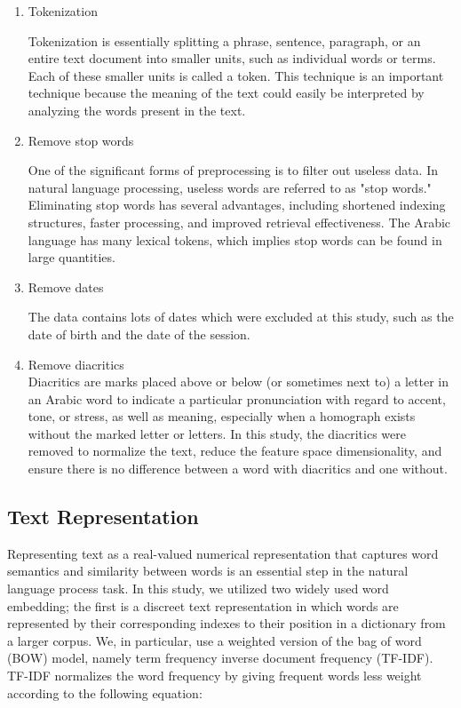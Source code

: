 \documentclass[sn-mathphys,Numbered]{sn-jnl}%
\theoremstyle{thmstyleone}%
\theoremstyle{thmstyletwo}%
\theoremstyle{thmstylethree}%
\begin{document}
\begin{enumerate}


\item Tokenization

Tokenization is essentially splitting a phrase, sentence, paragraph, or an entire text document into smaller units, such as individual words or terms. Each of these smaller units is called a token. This technique is an important technique because the meaning of the text could easily be interpreted by analyzing the words present in the text.

\item Remove stop words

One of the significant forms of preprocessing is to filter out useless data. In natural language processing, useless words are referred to as "stop words." Eliminating stop words has several advantages, including  shortened indexing structures, faster processing, and improved retrieval effectiveness. The Arabic language has many lexical tokens, which implies stop words can be found in large quantities.

\item Remove dates

The data contains lots of dates which were excluded at this study, such as the date of birth and the date of the session.
\item Remove diacritics\\
Diacritics are marks placed above or below (or sometimes next to) a letter in an Arabic word to indicate a particular pronunciation with regard to accent, tone, or stress, as well as meaning, especially when a homograph exists without the marked letter or letters. In this study, the diacritics were removed to normalize the text, reduce the feature space dimensionality, and ensure there is no difference between a word with diacritics and one without.

\end{enumerate}

\subsection{Text Representation}%
Representing text as a real-valued numerical representation that captures word semantics and similarity between words is an essential step in the natural language process task. In this study, we utilized two widely used word embedding; the first is a discreet text representation in which words are represented by their corresponding indexes to their position in a dictionary from a larger corpus. We, in particular, use a weighted version of the bag of word (BOW) model, namely term frequency inverse document frequency (TF-IDF). TF-IDF normalizes the word frequency by giving frequent words less weight according to the following equation:
\end{document}
